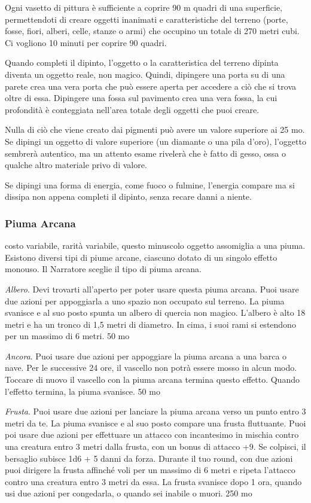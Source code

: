 \begin{multicols}{2}
Ogni vasetto di pittura è sufficiente a coprire 90 m quadri di una superficie, permettendoti di creare oggetti inanimati e caratteristiche del terreno (porte, fosse, fiori, alberi, celle, stanze o armi) che occupino un totale di 270 metri cubi. Ci vogliono 10 minuti per coprire 90 quadri.

Quando completi il dipinto, l'oggetto o la caratteristica del terreno dipinta diventa un oggetto reale, non magico. Quindi, dipingere una porta su di una parete crea una vera porta che può essere aperta per accedere a ciò che si trova oltre di essa. Dipingere una fossa sul pavimento crea una vera fossa, la cui profondità è conteggiata nell'area totale degli oggetti che puoi creare.

Nulla di ciò che viene creato dai pigmenti può avere un valore superiore ai 25 mo. Se dipingi un oggetto di valore superiore (un diamante o una pila d'oro), l'oggetto sembrerà autentico, ma un attento esame rivelerà che è fatto di gesso, ossa o qualche altro materiale privo di valore.

Se dipingi una forma di energia, come fuoco o fulmine, l'energia compare ma si dissipa non appena completi il dipinto, senza recare danni a niente.

\subsubsection*{Piuma Arcana}
costo variabile, rarità variabile, questo minuscolo oggetto assomiglia a una piuma. Esistono diversi tipi di piume arcane, ciascuno dotato di un singolo effetto monouso. Il Narratore sceglie il tipo di piuma arcana.

\textit{Albero}. Devi trovarti all'aperto per poter usare questa piuma arcana. Puoi usare due azioni per appoggiarla a uno spazio non occupato sul terreno. La piuma svanisce e al suo posto spunta un albero di quercia non magico. L'albero è alto 18 metri e ha un tronco di 1,5 metri di diametro. In cima, i suoi rami si estendono per un massimo di 6 metri. 50 mo

\textit{Ancora}. Puoi usare due azioni per appoggiare la piuma arcana a una barca o nave. Per le successive 24 ore, il vascello non potrà essere mosso in alcun modo. Toccare di nuovo il vascello con la piuma arcana termina questo effetto. Quando l'effetto termina, la piuma svanisce. 50 mo

\textit{Frusta}. Puoi usare due azioni per lanciare la piuma arcana verso un punto entro 3 metri da te. La piuma svanisce e al suo posto compare una frusta fluttuante. Puoi poi usare due azioni per effettuare un attacco con incantesimo in mischia contro una creatura entro 3 metri dalla frusta, con un bonus di attacco +9. Se colpisci, il bersaglio subisce 1d6 + 5 danni da forza. Durante il tuo round, con due azioni puoi dirigere la frusta affinché voli per un massimo di 6 metri e ripeta l'attacco contro una creatura entro 3 metri da essa. La frusta svanisce dopo 1 ora, quando usi due azioni per congedarla, o quando sei inabile o muori. 250 mo


\end{multicols}
